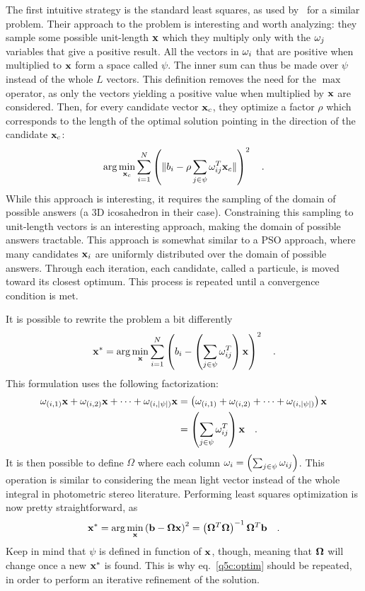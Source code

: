 \documentclass{report}
\begin{document}
The first intuitive strategy is the standard least squares, as used by~\cite{hung-wacv-15} for a similar problem. Their approach to the problem is interesting and worth analyzing: they sample some possible unit-length $\mathbf{x}$ which they multiply only with the $\mathbf{\omega}_j$ variables that give a positive result. All the vectors in $\mathbf{\omega}_i$ that are positive when multiplied to $\mathbf{x}$ form a space called $\psi$. The inner sum can thus be made over $\psi$ instead of the whole $L$ vectors. This definition removes the need for the $\max$ operator, as only the vectors yielding a positive value when multiplied by $\mathbf{x}$ are considered. Then, for every candidate vector $\mathbf{x}_c$, they optimize a factor $\rho$ which corresponds to the length of the optimal solution pointing in the direction of the candidate $\mathbf{x}_c$:
\begin{equation}
\arg \min_{\mathbf{x}_c} \sum_{i=1}^N \left( \| b_i - \rho \sum_{j \in \psi}\mathbf{\omega}_{ij}^T\mathbf{x}_c \| \right)^2
\quad.
\end{equation}
While this approach is interesting, it requires the sampling of the domain of possible answers (a 3D icosahedron in their case). Constraining this sampling to unit-length vectors is an interesting approach, making the domain of possible answers tractable. This approach is somewhat similar to a PSO approach, where many candidates $\mathbf{x}_i$ are uniformly distributed over the domain of possible answers. Through each iteration, each candidate, called a particule, is moved toward its closest optimum. This process is repeated until a convergence condition is met.

It is possible to rewrite the problem a bit differently
\begin{equation}
\mathbf{x^*} = \arg \min_{\mathbf{x}} \sum_{i=1}^N \left( b_i - \left( \sum_{j\in\psi} \mathbf{\omega}_{ij}^T\right) \mathbf{x} \right)^2
\quad.
\end{equation}
This formulation uses the following factorization:
\begin{align}
\mathbf{\omega}_{(i,1)}\mathbf{x} + \mathbf{\omega}_{(i,2)}\mathbf{x} + \dots + \mathbf{\omega}_{(i,\lvert \psi \rvert)}\mathbf{x} &= \left(\mathbf{\omega}_{(i,1)} + \mathbf{\omega}_{(i,2)} + \dots + \mathbf{\omega}_{(i,\lvert \psi \rvert)}\right)\mathbf{x} \\
&= \left( \sum_{j\in\psi} \mathbf{\omega}_{ij}^T\right) \mathbf{x}
\quad.
\end{align}
It is then possible to define $\Omega$ where each column $\omega_i = \left( \sum_{j\in\psi} \mathbf{\omega}_{ij}\right)$. This operation is similar to considering the mean light vector instead of the whole integral in photometric stereo literature. Performing least squares optimization is now pretty straightforward, as
\begin{equation}
\mathbf{x^*} = \arg \min_{\mathbf{x}} \left( \mathbf{b} - \mathbf{\Omega}\mathbf{x} \right)^2 = \left(\mathbf{\Omega}^T \mathbf{\Omega}\right)^{-1}\mathbf{\Omega}^T \mathbf{b}
\quad.
\label{q5c:optim}
\end{equation}
Keep in mind that $\psi$ is defined in function of $\mathbf{x}$, though, meaning that $\mathbf{\Omega}$ will change once a new $\mathbf{x^*}$ is found. This is why eq.~\eqref{q5c:optim} should be repeated, in order to perform an iterative refinement of the solution.
\end{document}
